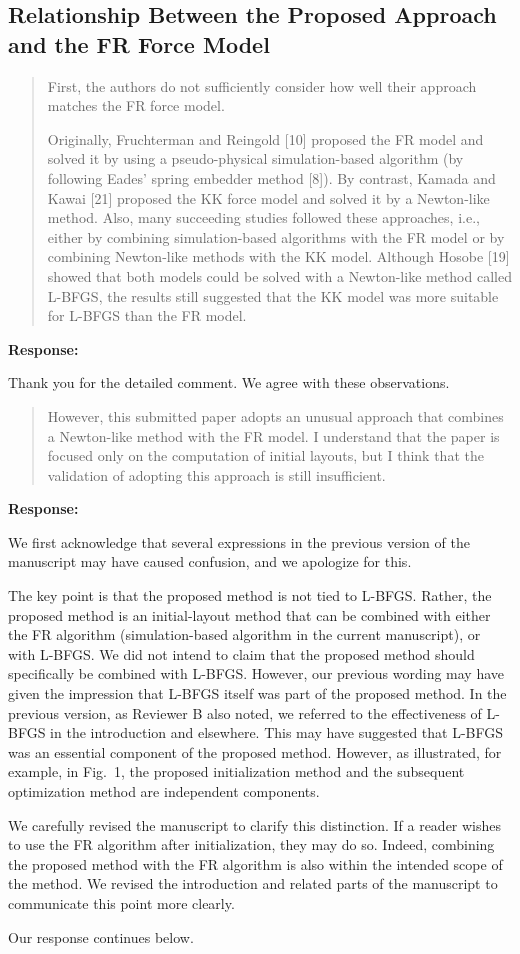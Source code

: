 \documentclass[11pt]{article}
\newcommand{\reviewercomment}[1]{%
  \begin{quote}
  \color{blue}
  #1
  \end{quote}
}
\newenvironment{response}{%
  \noindent\textbf{Response:}%
}{%
  \medskip
}
\begin{document}
\subsection{Relationship Between the Proposed Approach and the FR Force Model}

\reviewercomment{
  First, the authors do not sufficiently consider how well their approach matches the FR force model.

  Originally, Fruchterman and Reingold [10] proposed the FR model and solved it by using a pseudo-physical simulation-based algorithm (by following Eades' spring embedder method [8]).
  By contrast, Kamada and Kawai [21] proposed the KK force model and solved it by a Newton-like method.
  Also, many succeeding studies followed these approaches, i.e., either by combining simulation-based algorithms with the FR model or by combining Newton-like methods with the KK model.
  Although Hosobe [19] showed that both models could be solved with a Newton-like method called L-BFGS, the results still suggested that the KK model was more suitable for L-BFGS than the FR model.
}
\begin{response}
  Thank you for the detailed comment. We agree with these observations.
\end{response}

\reviewercomment{
  However, this submitted paper adopts an unusual approach that combines a Newton-like method with the FR model.
  I understand that the paper is focused only on the computation of initial layouts, but I think that the validation of adopting this approach is still insufficient.
}

\begin{response}
  We first acknowledge that several expressions in the previous version of the manuscript may have caused confusion, and we apologize for this.

  The key point is that the proposed method is not tied to L-BFGS. Rather, the proposed method is an initial-layout method that can be combined with either the FR algorithm (simulation-based algorithm in the current manuscript), or with L-BFGS.
  We did not intend to claim that the proposed method should specifically be combined with L-BFGS.
  However, our previous wording may have given the impression that L-BFGS itself was part of the proposed method.
  In the previous version, as Reviewer B also noted, we referred to the effectiveness of L-BFGS in the introduction and elsewhere. This may have suggested that L-BFGS was an essential component of the proposed method. However, as illustrated, for example, in Fig.~1, the proposed initialization method and the subsequent optimization method are independent components.

  We carefully revised the manuscript to clarify this distinction.  If a reader wishes to use the FR algorithm after initialization, they may do so. Indeed, combining the proposed method with the FR algorithm is also within the intended scope of the method. We revised the introduction and related parts of the manuscript to communicate this point more clearly.

  Our response continues below.
\end{response}
\end{document}
